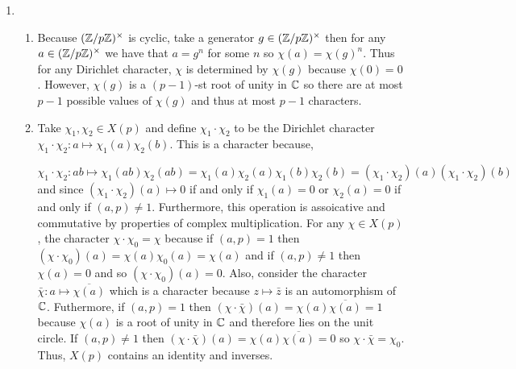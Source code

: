 \documentclass[12pt]{extarticle}
\begin{document}
 
\begin{enumerate}
\item 
\begin{enumerate}
\item Because $(\mathbb{Z} / p \mathbb{Z})^\times$ is cyclic, take a generator $g \in (\mathbb{Z} / p \mathbb{Z})^\times$ then for any $a \in (\mathbb{Z} / p \mathbb{Z})^\times$ we have that $a = g^n$ for some $n$ so $\chi(a) = \chi(g)^n$. Thus for any Dirichlet character, $\chi$ is determined by $\chi(g)$ because $\chi(0) = 0$. However, $\chi(g)$ is a $(p-1)$-st root of unity in $\mathbb{C}$ so there are at most $p-1$ possible values of $\chi(g)$ and thus at most $p-1$ characters.  

\item Take $\chi_1, \chi_2 \in X(p)$ and define $\chi_1 \cdot \chi_2$ to be the Dirichlet character $\chi_1 \cdot \chi_2 : a \mapsto \chi_1(a) \chi_2(b)$. This is a character because, 

\[\chi_1 \cdot \chi_2 : ab \mapsto \chi_1(ab) \chi_2(ab) = \chi_1(a) \chi_2(a) \chi_1(b) \chi_2(b) = (\chi_1 \cdot \chi_2)(a) (\chi_1 \cdot \chi_2)(b)\]
and since $(\chi_1 \cdot \chi_2)(a) \mapsto 0$ if and only if $\chi_1(a) = 0$ or $\chi_2(a) = 0$ if and only if $(a, p) \neq 1$. Furthermore, this operation is assoicative and commutative by properties of complex multiplication. For any $\chi \in X(p)$, the character $\chi \cdot \chi_0 = \chi$ because if $(a, p) = 1$ then $(\chi \cdot \chi_0)(a) = \chi(a) \chi_0(a) = \chi(a)$ and if $(a, p) \neq 1$ then $\chi(a) = 0$ and so $(\chi \cdot \chi_0)(a) = 0$. Also, consider the character $\bar{\chi} : a \mapsto \overline{\chi(a)}$ which is a character because $z \mapsto \bar{z}$ is an automorphism of $\mathbb{C}$. Futhermore, if $(a, p) = 1$ then $(\chi \cdot \bar{\chi})(a) = \chi(a) \overline{\chi(a)} = 1$ because $\chi(a)$ is a root of unity in $\mathbb{C}$ and therefore lies on the unit circle. If $(a, p) \neq 1$ then $(\chi \cdot \bar{\chi})(a) = \chi(a) \overline{\chi(a)} = 0$ so $\chi \cdot \bar{\chi} = \chi_0$. Thus, $X(p)$ contains an identity and inverses. 


\end{enumerate}
\end{enumerate}
\end{document}
